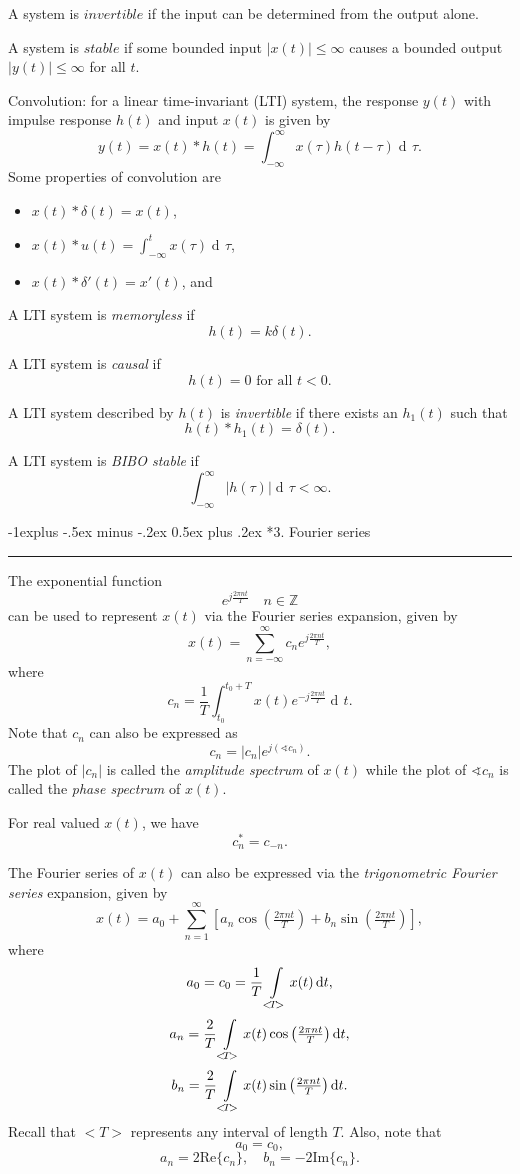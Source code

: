 \documentclass[10pt,letterpaper]{article}
\makeatletter
\DeclareMathOperator{\di}{d\!} %
\newcommand{\sumi}[1][1]{ \sum_{n={#1}}^{\infty} } %
\newcommand{\tpfrac}[2]{\left(\tfrac{#1}{#2}\right)} %
\newcommand{\abs}[1]{\left| #1 \right|} %
\newcommand{\sbracks}[1]{\left[ #1 \right]} %
\newcommand{\Z}{\mathbb{Z}}
\newcommand{\impulse}{ \delta(t) }
\newcommand{\Iint}{ \int_{-\infty}^{\infty} }
\newcommand{\Uint}{ \int\displaylimits_{<\!T\!>} }
\newcommand{\epos}{ e^{j\frac{2\pi nt}{T}} }
\newcommand{\eneg}{ e^{-j\frac{2\pi nt}{T}} }
\newcommand{\fatcos}{ \cos\tpfrac{2\pi nt}{T} }
\newcommand{\fatsin}{ \sin\tpfrac{2\pi nt}{T} }
\newcommand{\underlineSection}[1][unnamed]{
\subsection*{#1}
\hrule
\vspace{12pt}
}
\renewcommand{\subsection}{\@startsection{subsection}{2}{0mm}%
                                {-1explus -.5ex minus -.2ex}%
                                {0.5ex plus .2ex}%
                                {\normalfont\normalsize\bfseries}}
\makeatother
\begin{document}
\begin{multicols*}{3}
A system is $invertible$ if the input can be determined from the output alone.

A system is $stable$ if some bounded input $\abs{x(t)} \leq \infty$ causes a bounded output $\abs{y(t)} \leq \infty$ for all $t$.

Convolution: for a linear time-invariant (LTI) system, the response $y(t)$ with impulse response $h(t)$ and input $x(t)$ is given by
\[ y(t) = x(t)*h(t) = \Iint x(\tau) h(t-\tau) \di \tau. \]
Some properties of convolution are
\begin{itemize}[leftmargin=0.5cm]
\item $x(t)*\impulse = x(t)$,
\item $\displaystyle x(t)*u(t) = \int_{-\infty}^t x(\tau) \di\tau$,
\item $x(t)*\delta'(t) = x'(t)$, and
\end{itemize}

A LTI system is \textit{memoryless} if
\[ h(t) = k\impulse. \]

A LTI system is \textit{causal} if
\[ h(t) = 0 \text{ for all } t < 0. \]

A LTI system described by $h(t)$ is \textit{invertible} if there exists an $h_1(t)$ such that
\[ h(t)*h_1(t) = \impulse. \]

A LTI system is \textit{BIBO stable} if
\[ \Iint \abs{h(\tau)} \di\tau < \infty. \]

\underlineSection[3. Fourier series]
The exponential function
\[ \epos \quad n \in \Z \]
can be used to represent $x(t)$ via the Fourier series expansion, given by
\[ x(t) = \sumi[-\infty] c_n \epos, \]
where
\[ c_n = \dfrac{1}{T} \int_{t_0}^{t_0 + T} x(t) \eneg \di t. \]
Note that $c_n$ can also be expressed as
\[ c_n = |c_n|e^{j(\sphericalangle c_n)}. \]
The plot of $|c_n|$ is called the \textit{amplitude spectrum} of $x(t)$ while the plot of $\sphericalangle c_n$ is called the \textit{phase spectrum} of $x(t)$.

For real valued $x(t)$, we have
\[ c_n^* = c_{-n}. \]

The Fourier series of $x(t)$ can also be expressed via the \textit{trigonometric Fourier series} expansion, given by
\[ x(t) = a_0 + \sumi \sbracks{ a_n \fatcos + b_n \fatsin }, \]
where
\[ a_0 = c_0 = \dfrac{1}{T} \Uint x(t) \di t, \]
\[ a_n = \dfrac{2}{T} \Uint x(t) \fatcos \di t, \]
\[ b_n = \dfrac{2}{T} \Uint x(t) \fatsin \di t. \]
Recall that $< \!\!\! T \!\!\! >$ represents any interval of length $T$. Also, note that
\[ a_0 = c_0, \]
\[ a_n = 2\text{Re}\{c_n\}, \quad b_n = -2\text{Im}\{c_n\}. \]


\end{multicols*}
\end{document}
